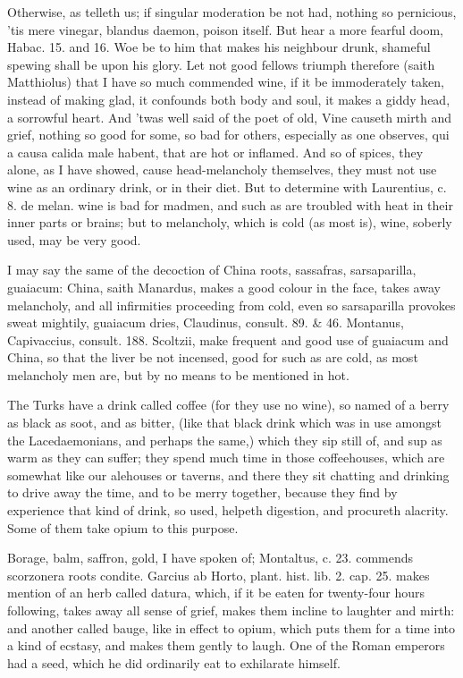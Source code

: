 Otherwise, as  \Pliny{} telleth us; if singular moderation be not
had, nothing so pernicious, 'tis mere vinegar, blandus daemon,
poison itself. But hear a more fearful doom, Habac.  15. and 16. Woe
be to him that makes his neighbour drunk, shameful spewing shall be
upon his glory. Let not good fellows triumph therefore (saith
Matthiolus) that I have so much commended wine, if it be immoderately
taken, instead of making glad, it confounds both body and soul, it
makes a giddy head, a sorrowful heart. And 'twas well said of the poet
of old, Vine causeth mirth and grief, nothing so good for some,
so bad for others, especially as one observes, qui a causa calida
male habent, that are hot or inflamed. And so of spices, they alone, as
I have showed, cause head-melancholy themselves, they must not use wine
as an ordinary drink, or in their diet. But to determine with
Laurentius, c. 8. de melan. wine is bad for madmen, and such as are
troubled with heat in their inner parts or brains; but to melancholy,
which is cold (as most is), wine, soberly used, may be very good.

I may say the same of the decoction of China roots, sassafras,
sarsaparilla, guaiacum: China, saith Manardus, makes a good colour in
the face, takes away melancholy, and all infirmities proceeding from
cold, even so sarsaparilla provokes sweat mightily, guaiacum dries,
Claudinus, consult. 89. \& 46. Montanus, Capivaccius, consult. 188.
Scoltzii, make frequent and good use of guaiacum and China, so
that the liver be not incensed, good for such as are cold, as most
melancholy men are, but by no means to be mentioned in hot.

The Turks have a drink called coffee (for they use no wine), so named
of a berry as black as soot, and as bitter, (like that black drink
which was in use amongst the Lacedaemonians, and perhaps the same,)
which they sip still of, and sup as warm as they can suffer; they spend
much time in those coffeehouses, which are somewhat like our alehouses
or taverns, and there they sit chatting and drinking to drive away the
time, and to be merry together, because they find by experience that
kind of drink, so used, helpeth digestion, and procureth alacrity. Some
of them take opium to this purpose.

Borage, balm, saffron, gold, I have spoken of; Montaltus, c. 23.
commends scorzonera roots condite. Garcius ab Horto, plant. hist. lib.
2. cap. 25. makes mention of an herb called datura, which, if it
be eaten for twenty-four hours following, takes away all sense of
grief, makes them incline to laughter and mirth: and another called
bauge, like in effect to opium, which puts them for a time into a kind
of ecstasy, and makes them gently to laugh. One of the Roman emperors
had a seed, which he did ordinarily eat to exhilarate himself.

